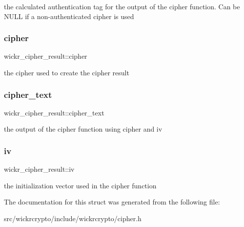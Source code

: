 the calculated authentication tag for the output of the cipher function. Can be N\+U\+LL if a non-\/authenticated cipher is used \mbox{\label{structwickr__cipher__result_a80f15a012dbe1342d0aaa6f3e7072aa9}} 
\subsubsection{\texorpdfstring{cipher}{cipher}}
{\footnotesize\ttfamily wickr\+\_\+cipher\+\_\+result\+::cipher}

the cipher used to create the cipher result \mbox{\label{structwickr__cipher__result_a29fe7c04025f39cc574ac41f846d167a}} 
\subsubsection{\texorpdfstring{cipher\_text}{cipher\_text}}
{\footnotesize\ttfamily wickr\+\_\+cipher\+\_\+result\+::cipher\+\_\+text}

the output of the cipher function using \textquotesingle{}cipher\textquotesingle{} and \textquotesingle{}iv\textquotesingle{} \mbox{\label{structwickr__cipher__result_a741b49cc09cddfce1924e7a26ab8b35b}} 
\subsubsection{\texorpdfstring{iv}{iv}}
{\footnotesize\ttfamily wickr\+\_\+cipher\+\_\+result\+::iv}

the initialization vector used in the cipher function 

The documentation for this struct was generated from the following file\+:\begin{DoxyCompactItemize}
\item 
src/wickrcrypto/include/wickrcrypto/cipher.\+h\end{DoxyCompactItemize}
